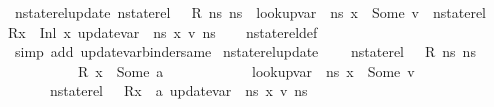 \begin{isabellebody}
\isanewline
{}\isamarkupfalse%
\ nstate{\isacharunderscore}{\kern0pt}rel{\isacharunderscore}{\kern0pt}update{\isacharcolon}{\kern0pt}\ {\isachardoublequoteopen}nstate{\isacharunderscore}{\kern0pt}rel\ {\isasymLambda}\ {\isasymLambda}{\isacharprime}{\kern0pt}\ R\ ns{}\ ns{}\ {\isasymLongrightarrow}\ lookup{\isacharunderscore}{\kern0pt}var\ {\isasymLambda}{\isacharprime}{\kern0pt}\ ns{}\ x{\isacharprime}{\kern0pt}\ {\isacharequal}{\kern0pt}\ Some\ v\ {\isasymLongrightarrow}\ nstate{\isacharunderscore}{\kern0pt}rel\ {\isasymLambda}\ {\isasymLambda}{\isacharprime}{\kern0pt}\ {\isacharparenleft}{\kern0pt}R{\isacharparenleft}{\kern0pt}x\ {\isasymmapsto}\ Inl\ x{\isacharprime}{\kern0pt}{\isacharparenright}{\kern0pt}{\isacharparenright}{\kern0pt}\ {\isacharparenleft}{\kern0pt}update{\isacharunderscore}{\kern0pt}var\ {\isasymLambda}\ ns{}\ x\ v{\isacharparenright}{\kern0pt}\ ns{}{\isachardoublequoteclose}\isanewline
%
\isadelimproof
\ \ %
\endisadelimproof
%
\isatagproof
{}\isamarkupfalse%
\ nstate{\isacharunderscore}{\kern0pt}rel{\isacharunderscore}{\kern0pt}def\isanewline
\ \ \isamarkupfalse%
\ {\isacharparenleft}{\kern0pt}simp\ add{\isacharcolon}{\kern0pt}\ update{\isacharunderscore}{\kern0pt}var{\isacharunderscore}{\kern0pt}binder{\isacharunderscore}{\kern0pt}same{\isacharparenright}{\kern0pt}%
\endisatagproof
{\isafoldproof}%
%
\isadelimproof
\isanewline
%
\endisadelimproof
\isanewline
{}\isamarkupfalse%
\ nstate{\isacharunderscore}{\kern0pt}rel{\isacharunderscore}{\kern0pt}update{\isacharunderscore}{\kern0pt}{}{\isacharcolon}{\kern0pt}\ \isanewline
\ \ \ {\isachardoublequoteopen}nstate{\isacharunderscore}{\kern0pt}rel\ {\isasymLambda}\ {\isasymLambda}{\isacharprime}{\kern0pt}\ R\ ns{}\ ns{}{\isachardoublequoteclose}\ \ \isanewline
\ \ \ \ \ \ \ \ \ \ {\isachardoublequoteopen}R\ x{\isacharprime}{\kern0pt}\ {\isacharequal}{\kern0pt}\ Some\ a{\isachardoublequoteclose}\ \ \isanewline
\ \ \ \ \ \ \ \ \ \ {\isachardoublequoteopen}lookup{\isacharunderscore}{\kern0pt}var\ {\isasymLambda}\ ns{}\ x{\isacharprime}{\kern0pt}\ {\isacharequal}{\kern0pt}\ Some\ v{\isachardoublequoteclose}\isanewline
\ \ \ \ \ \ {\isachardoublequoteopen}nstate{\isacharunderscore}{\kern0pt}rel\ {\isasymLambda}\ {\isasymLambda}{\isacharprime}{\kern0pt}\ {\isacharparenleft}{\kern0pt}R{\isacharparenleft}{\kern0pt}x\ {\isasymmapsto}\ a{\isacharparenright}{\kern0pt}{\isacharparenright}{\kern0pt}\ {\isacharparenleft}{\kern0pt}update{\isacharunderscore}{\kern0pt}var\ {\isasymLambda}\ ns{}\ x\ v{\isacharparenright}{\kern0pt}\ ns{}{\isachardoublequoteclose}\isanewline

\end{isabellebody}
